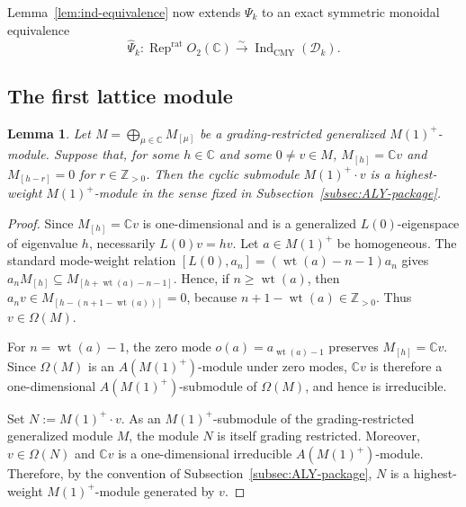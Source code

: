 \documentclass[10pt,a4paper]{amsart}
\numberwithin{equation}{section} \newtheorem{thm}{Theorem}[section] \newtheorem{lem}[thm]{Lemma} \newtheorem{ex}[thm]{Example} \newtheorem{prop}[thm]{Proposition} \newtheorem{cor}[thm]{Corollary} \newtheorem{defi}[thm]{Definition} \newtheorem{rmk}[thm]{Remark} \newtheorem{notation}[thm]{Notation}
\newcommand{\wt}{\operatorname{wt}}
\newcommand{\Rep}{\operatorname{Rep}}
\newcommand{\Dk}{\mathcal D_k}
\newcommand{\IndCMY}{\operatorname{Ind}_{\mathrm{CMY}}}
\newcommand{\Otwo}{O_2(\C)}
\def\Z{\mathbb{Z}} \def\N{\mathbb{N}} \def\A{\mathbb{A}} \def\C{\mathbb{C}} \def\R{\mathbb{R}} \def\Q{\mathbb{Q}} \def\F{\mathbb{F}}
\begin{document}
Lemma~\ref{lem:ind-equivalence} now extends $\Psi_k$ to an exact symmetric monoidal equivalence
\[
\widehat\Psi_k:\Rep^{\mathrm{rat}}\Otwo\overset\sim\longrightarrow\IndCMY(\Dk).
\]
\subsection{The first lattice module}

\begin{lem}\label{lem:M1plus-lowest-line}
Let $M=\bigoplus_{\mu\in\C}M_{[\mu]}$ be a grading-restricted generalized $M(1)^+$-module. Suppose that, for some $h\in\C$ and some $0\ne v\in M$, \(M_{[h]}=\C v\) and \(M_{[h-r]}=0\) for \(r\in\Z_{>0}\). Then the cyclic submodule $M(1)^+\cdot v$ is a highest-weight $M(1)^+$-module in the sense fixed in Subsection~\ref{subsec:ALY-package}.
\end{lem}

\begin{proof}
Since $M_{[h]}=\C v$ is one-dimensional and is a generalized $L(0)$-eigenspace of eigenvalue $h$, necessarily $L(0)v=hv$. Let $a\in M(1)^+$ be homogeneous. The standard mode-weight relation \([L(0),a_n]=(\wt(a)-n-1)a_n\) gives \(a_nM_{[h]}\subseteq M_{[h+\wt(a)-n-1]}\). Hence, if $n\ge\wt(a)$, then \(a_nv\in M_{[h-(n+1-\wt(a))]}=0\), because $n+1-\wt(a)\in\Z_{>0}$. Thus $v\in\Omega(M)$.

For $n=\wt(a)-1$, the zero mode $o(a)=a_{\wt(a)-1}$ preserves $M_{[h]}=\C v$. Since $\Omega(M)$ is an $A(M(1)^+)$-module under zero modes, $\C v$ is therefore a one-dimensional $A(M(1)^+)$-submodule of $\Omega(M)$, and hence is irreducible.

Set $N:=M(1)^+\cdot v$. As an $M(1)^+$-submodule of the grading-restricted generalized module $M$, the module $N$ is itself grading restricted. Moreover, $v\in\Omega(N)$ and $\C v$ is a one-dimensional irreducible $A(M(1)^+)$-module. Therefore, by the convention of Subsection~\ref{subsec:ALY-package}, $N$ is a highest-weight $M(1)^+$-module generated by $v$.
\end{proof}
\end{document}
